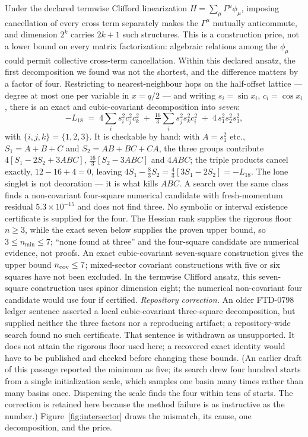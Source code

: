 \documentclass[11pt,a4paper]{article}
\theoremstyle{definition}
\theoremstyle{plain}
\theoremstyle{remark}
\begin{document}
Under the declared termwise Clifford linearization
$H = \sum_\mu\Gamma^\mu\phi_\mu$, imposing cancellation of every cross term
separately makes the $\Gamma^\mu$ mutually anticommute, and dimension $2^k$
carries $2k+1$ such structures. This is a construction price, not a lower
bound on every matrix factorization: algebraic relations among the
$\phi_\mu$ could permit collective cross-term cancellation. Within this
declared ansatz, the
first decomposition we found was not the shortest, and the difference
matters by a factor of four. Restricting to nearest-neighbour hops on the
half-offset lattice --- degree at most one per variable in $x = q/2$ --- and
writing $s_i = \sin x_i$, $c_i = \cos x_i$, there is an exact and
cubic-covariant decomposition into \emph{seven}:
\begin{equation}
\label{eq:seven}
-L_{18} \;=\; 4\sum_i s_i^2c_j^2c_k^2
\;+\;\tfrac{16}{3}\sum_i s_j^2s_k^2c_i^2
\;+\;4\,s_1^2s_2^2s_3^2 ,
\end{equation}
with $\{i,j,k\}=\{1,2,3\}$. It is checkable by hand: with $A = s_1^2$ etc.,
$S_1 = A+B+C$ and $S_2 = AB+BC+CA$, the three groups contribute
$4[S_1-2S_2+3ABC]$, $\tfrac{16}3[S_2-3ABC]$ and $4ABC$; the triple products
cancel exactly, $12-16+4 = 0$, leaving
$4S_1-\tfrac83S_2 = \tfrac43[3S_1-2S_2] = -L_{18}$. The lone singlet is not
decoration --- it is what kills $ABC$. A search over the same class finds
a non-covariant four-square numerical candidate with fresh-momentum residual
$5.3\times10^{-15}$ and does not find three. No symbolic or interval
existence certificate is supplied for the four. The Hessian rank supplies
the rigorous floor $n\ge3$, while the exact seven below supplies the proven
upper bound, so $3\le n_{\min}\le7$; ``none found at three'' and the
four-square candidate are numerical evidence, not proofs. An exact
cubic-covariant seven-square construction gives the
upper bound $n_{\rm cov}\le7$; mixed-sector covariant constructions with
five or six squares have not been excluded. In the termwise Clifford ansatz,
this seven-square construction uses spinor dimension eight; the numerical
non-covariant four candidate would use four if certified.
\emph{Repository correction.} An older FTD-0798 ledger sentence asserted
a local cubic-covariant three-square decomposition, but supplied neither
the three factors nor a reproducing artifact; a repository-wide search
found no such certificate. That sentence is withdrawn as unsupported. It
does not attain the rigorous floor used here; a recovered exact identity
would have to be published and checked before changing these bounds.
(An earlier draft of this passage reported the minimum as five; its
search drew four hundred starts from a single initialization scale, which
samples one basin many times rather than many basins once. Dispersing the
scale finds the four within tens of starts. The correction is retained
here because the method failure is as instructive as the number.)
Figure~\ref{fig:intersector} draws the mismatch, its cause, one
decomposition, and the price.
\end{document}
